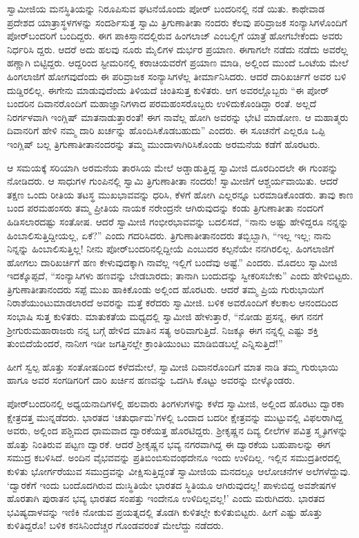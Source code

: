 ಸ್ವಾಮೀಜಿಯ ಮನಸ್ಥಿತಿಯನ್ನು ನಿರೂಪಿಸುವ ಘಟನೆಯೊಂದು ಪೋರ್ ಬಂದರಿನಲ್ಲಿ ನಡೆ ಯಿತು. ಕಾಥೇವಾಡ ಪ್ರದೇಶದ ಯಾತ್ರಾಸ್ಥಳಗಳನ್ನು ಸಂದರ್ಶಿಸುತ್ತ ಸ್ವಾಮಿ ತ್ರಿಗುಣಾತೀತಾ ನಂದರು ಕೆಲವು ಪರಿವ್ರಾಜಕ ಸಂನ್ಯಾಸಿಗಳೊಂದಿಗೆ ಪೋರ್​ಬಂದರಿಗೆ ಬಂದಿದ್ದರು. ಈಗ ಪಾಕಿಸ್ತಾನದಲ್ಲಿರುವ ಹಿಂಗಲಾಜ್ ಎಂಬಲ್ಲಿಗೆ ಯಾತ್ರೆ ಹೋಗಬೇಕೆಂದು ಅವರು ನಿರ್ಧರಿಸಿ ದ್ದರು. ಆದರೆ ಅದು ಹಲವು ನೂರು ಮೈಲಿಗಳ ದುರ್ಭರ ಪ್ರಯಾಣ. ಈಗಾಗಲೇ ನಡೆದು ನಡೆದು ಅವರೆಲ್ಲ ಹಣ್ಣಾಗಿ ಬಿಟ್ಟಿದ್ದರು. ಆದ್ದರಿಂದ ಸ್ಟೀಮರಿನಲ್ಲಿ ಕರಾಚಿಯವರೆಗೆ ಪ್ರಯಾಣ ಮಾಡಿ, ಅಲ್ಲಿಂದ ಮುಂದೆ ಒಂಟೆಯ ಮೇಲೆ ಹಿಂಗಲಾಜಿಗೆ ಹೋಗವುದೆಂದು ಈ ಪರಿವ್ರಾಜಕ ಸಂನ್ಯಾಸಿಗಳೆಲ್ಲ ತೀರ್ಮಾನಿಸಿದರು. ಆದರೆ ದಾರಿಖರ್ಚಿಗೆ ಅವರ ಬಳಿ ದುಡ್ಡಿರಲಿಲ್ಲ. ಈಗೇನು ಮಾಡುವುದೆಂದು ತಿಳಿಯದೆ ಚಿಂತಿಸುತ್ತ ಕುಳಿತರು. ಆಗ ಅವರಲ್ಲೊಬ್ಬರು “ಈ ಪೋರ್ ಬಂದರಿನ ದಿವಾನರೊಂದಿಗೆ ಮಹಾಜ್ಞಾನಿಗಳಾದ ಪರಮಹಂಸರೊಬ್ಬರು ಉಳಿದುಕೊಂಡಿದ್ದಾ ರಂತೆ. ಅಲ್ಲದೆ ನಿರರ್ಗಳವಾಗಿ ಇಂಗ್ಲಿಷ್ ಮಾತನಾಡುತ್ತಾರಂತೆ! ಈಗ ನಾವೆಲ್ಲ ಹೋಗಿ ಅವರನ್ನು ಭೇಟಿ ಮಾಡೋಣ. ಆ ಮಹಾತ್ಮರು ದಿವಾನರಿಗೆ ಹೇಳಿ ನಮ್ಮ ದಾರಿ ಖರ್ಚನ್ನು ಹೊಂದಿಸಿಕೊಡಬಹುದು” ಎಂದರು. ಈ ಸೂಚನೆಗೆ ಎಲ್ಲರೂ ಒಪ್ಪಿ ಇಂಗ್ಲಿಷ್ ಬಲ್ಲ ತ್ರಿಗುಣಾತೀತಾನಂದರನ್ನು ತಮ್ಮ ಮುಂದಾಳಾಗಿರಿಸಿಕೊಂಡು ಅರಮನೆಯ ಕಡೆಗೆ ಹೊರಟರು.

ಆ ಸಮಯಕ್ಕೆ ಸರಿಯಾಗಿ ಅರಮನೆಯ ತಾರಸಿಯ ಮೇಲೆ ಅಡ್ಡಾಡುತ್ತಿದ್ದ ಸ್ವಾಮೀಜಿ ದೂರದಿಂದಲೇ ಈ ಗುಂಪನ್ನು ನೋಡಿದರು. ಆ ಸಾಧುಗಳ ಗುಂಪಿನಲ್ಲಿ ಸ್ವಾಮಿ ತ್ರಿಗುಣಾತೀತಾ ನಂದರು! ಸ್ವಾಮೀಜಿಗೆ ಆಶ್ಚರ್ಯವಾಯಿತು. ಆದರೆ ತಕ್ಷಣ ಒಂದು ರೀತಿಯ ತಟಸ್ಥ ಮುಖಭಾವವನ್ನು ಧರಿಸಿ, ಕೆಳಗೆ ಹೋಗಿ ಎಲ್ಲರನ್ನೂ ಬರಮಾಡಿಕೊಂಡರು. ತಾವು ಕಾಣ ಬಂದ ಪರಮಹಂಸರು ತಮ್ಮ ಪ್ರೀತಿಯ ನಾಯಕ ನರೇಂದ್ರನೇ ಆಗಿರುವುದನ್ನು ಕಂಡು ತ್ರಿಗುಣಾತೀತಾ ನಂದರಿಗೆ ಹಿಡಿಸಲಾರದಷ್ಟು ಸಂತೋಷ. ಆದರೆ ಸ್ವಾಮೀಜಿ ಗಂಭೀರಭಾವವನ್ನು ಬದಲಿಸದೆ, “ನಾನು ಅಷ್ಟು ಹೇಳಿದ್ದರೂ ನನ್ನನ್ನು ಹಿಂಬಾಲಿಸುತ್ತಿದ್ದೀಯಲ್ಲ, ಏಕೆ?” ಎಂದು ಗದರಿಸಿದರು. ತ್ರಿಗುಣಾತೀತಾನಂದರು ತಬ್ಬಿಬ್ಬಾಗಿ, “ಇಲ್ಲ ಇಲ್ಲ; ನಾನು ನಿನ್ನನ್ನು ಹಿಂಬಾಲಿಸುತ್ತಿಲ್ಲ! ನೀನು ಪೋರ್​ಬಂದರಿನಲ್ಲಿದ್ದೀಯೆ ಎಂಬುದರ ಕಲ್ಪನೆಯೇ ನನಗಿರಲಿಲ್ಲ. ಹಿಂಗಲಾಜಿಗೆ ಹೋಗಲು ದಾರಿಖರ್ಚಿಗೆ ಹಣ ಕೇಳುವುದಕ್ಕಾಗಿ ನಾವೆಲ್ಲ ಇಲ್ಲಿಗೆ ಬಂದೆವು ಅಷ್ಟೆ.” ಎಂದರು. ಮೊದಲು ಸ್ವಾಮೀಜಿ ಇದಕ್ಕೊಪ್ಪದೆ, “ಸಂನ್ಯಾಸಿಗಳು ಹಣವನ್ನು ಬೇಡಬಾರದು; ತಾನಾಗಿ ಬಂದುದನ್ನು ಸ್ವೀಕರಿಸಬೇಕು” ಎಂದು ಹೇಳಿಬಿಟ್ಟರು. ತ್ರಿಗುಣಾತೀತಾನಂದರು ಸಪ್ಪೆ ಮುಖ ಹಾಕಿಕೊಂಡು ಅಲ್ಲಿಂದ ಹೊರಟರು. ಆದರೆ ತಮ್ಮ ಪ್ರಿಯ ಗುರುಭಾಯಿಗೆ ನಿರಾಶೆಯುಂಟುಮಾಡಲಾರದೆ ಅವರನ್ನು ಮತ್ತೆ ಕರೆದರು ಸ್ವಾಮೀಜಿ. ಬಳಿಕ ಅವರೊಂದಿಗೆ ಕೆಲಕಾಲ ಆನಂದದಿಂದ ಸಂಭಾಷಿ ಸುತ್ತ ಕುಳಿತರು. ಮಾತುಕತೆಯ ಮಧ್ಯದಲ್ಲಿ ಸ್ವಾಮೀಜಿ ಹೇಳುತ್ತಾರೆ, “ನೋಡು ಪ್ರಸನ್ನ, ಈಗ ನನಗೆ ಶ್ರೀಗುರುಮಹಾರಾಜರು ನನ್ನ ಬಗ್ಗೆ ಹೇಳಿದ ಮಾತಿನ ಸತ್ಯ ಅರಿವಾಗುತ್ತಿದೆ. ನಿಜಕ್ಕೂ ಈಗ ನನ್ನಲ್ಲಿ ಎಷ್ಟು ಶಕ್ತಿ ತುಂಬಿದೆಯೆಂದರೆ, ನಾನೀಗ ಇಡೀ ಜಗತ್ತಿನಲ್ಲೇ ಕ್ರಾಂತಿಯುಂಟು ಮಾಡಿಬಿಡಬಲ್ಲೆ ಎನ್ನಿಸುತ್ತಿದೆ!”

ಹೀಗೆ ಸ್ವಲ್ಪ ಹೊತ್ತು ಸಂತೋಷದಿಂದ ಕಳೆದಮೇಲೆ, ಸ್ವಾಮೀಜಿ ದಿವಾನರೊಂದಿಗೆ ಮಾತ ನಾಡಿ ತಮ್ಮ ಗುರುಭಾಯಿ ಹಾಗೂ ಅವರ ಸಂಗಡಿಗರಿಗೆ ದಾರಿ ಖರ್ಚಿನ ಹಣವನ್ನು ಒದಗಿಸಿ ಕೊಟ್ಟು ಅವರನ್ನು ಬೀಳ್ಕೊಂಡರು.

ಪೋರ್​ಬಂದರಿನಲ್ಲಿ ಅಧ್ಯಯನಾದಿಗಳಲ್ಲಿ ಹಲವಾರು ತಿಂಗಳುಗಳನ್ನು ಕಳೆದ ಸ್ವಾಮೀಜಿ, ಅಲ್ಲಿಂದ ಹೊರಟು ದ್ವಾರಕಾ ಕ್ಷೇತ್ರದತ್ತ ಮುನ್ನಡೆದರು. ಭಾರತದ ‘ಚತುರ್ಧಾಮ’ಗಳಲ್ಲಿ ಒಂದಾದ ಬದರೀ ಕ್ಷೇತ್ರವನ್ನು ಮುಟ್ಟುವಲ್ಲಿ ವಿಫಲರಾಗಿದ್ದ ಅವರು, ಅಲ್ಲಿಂದ ಪಶ್ಚಿಮದ ಧಾಮವಾದ ದ್ವಾರಕೆಯತ್ತ ಹೊರಟಿದ್ದರು. ಶ್ರೀಕೃಷ್ಣನ ದಿವ್ಯ ಲೀಲೆಗಳ ಪವಿತ್ರ ಸ್ಮೃತಿಗಳನ್ನು ಹೊತ್ತು ನಿಂತಿರುವ ಪಟ್ಟಣ ದ್ವಾರಕೆ. ಆದರೆ ಶ್ರೀಕೃಷ್ಣನ ಭವ್ಯ ನಗರವಾಗಿದ್ದ ಈ ದ್ವಾರಕೆಯ ಬಹುಪಾಲನ್ನು ಈಗ ಸಮುದ್ರ ಕಬಳಿಸಿದೆ. ಅಂದಿನ ವೈಭವವನ್ನು ಪ್ರತಿಬಿಂಬಿಸುವಂಥದೇನೂ ಇಂದು ಉಳಿದಿಲ್ಲ. ಇಲ್ಲಿನ ಸಮುದ್ರತೀರದಲ್ಲಿ ಕುಳಿತು ಭೋರ್ಗರೆಯುವ ಸಮುದ್ರವನ್ನು ವೀಕ್ಷಿಸುತ್ತಿದ್ದಂತೆ ಸ್ವಾಮೀಜಿಯ ಮನದಲ್ಲೂ ಆಲೋಚನೆಗಳ ಅಲೆಗಳೆದ್ದುವು. ‘ದ್ವಾರಕೆಗೆ ಇಂದು ಬಂದೊದಗಿರುವ ದುಃಸ್ಥಿತಿಯೇ ಭಾರತದ ಸ್ಥಿತಿಯೂ ಆಗಿರುವುದಲ್ಲ! ಪಾಳುಬಿದ್ದ ಅವಶೇಷಗಳ ಹೊರತಾಗಿ ಪುರಾತನ ಭವ್ಯ ಭಾರತದ ಸಂಪತ್ತು ಇಂದೇನೂ ಉಳಿದಿಲ್ಲವಲ್ಲ!’ ಎಂದು ಮರುಗಿದರು. ಭಾರತದ ಭವಿಷ್ಯದಾಳವನ್ನು ಇಣಿಕಿ ನೋಡುವ ಪ್ರಯತ್ನದಲ್ಲಿ ತೊಡಗಿ ಕುಳಿತಲ್ಲೇ ಕುಳಿತುಬಿಟ್ಟರು. ಹೀಗೆ ಎಷ್ಟು ಹೊತ್ತು ಕುಳಿತಿದ್ದರೊ! ಬಳಿಕ ಕನಸಿನಿಂದೆಚ್ಚರ ಗೊಂಡವರಂತೆ ಮೇಲೆದ್ದು ನಡೆದರು.

